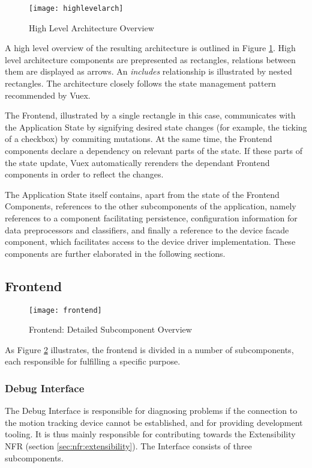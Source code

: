 \begin{figure}[h]
    \centering
    \texttt{[image: highlevelarch]}
    \caption{High Level Architecture Overview}
    \label{fig:high-level-architecture}
\end{figure}
A high level overview of the resulting architecture is outlined in Figure \ref{fig:high-level-architecture}. High level architecture components are prepresented as rectangles, relations between them are displayed as arrows. An \emph{includes} relationship is illustrated by nested rectangles. The architecture closely follows the state management pattern recommended by Vuex. 

The Frontend, illustrated by a single rectangle in this case, communicates with the Application State by signifying desired state changes (for example, the ticking of a checkbox) by commiting mutations. At the same time, the Frontend components declare a dependency on relevant parts of the state. If these parts of the state update, Vuex automatically rerenders the dependant Frontend components in order to reflect the changes.

The Application State itself contains, apart from the state of the Frontend Components, references to the other subcomponents of the application, namely references to a component facilitating persistence, configuration information for data preprocessors and classifiers, and finally a reference to the device facade component, which facilitates access to the device driver implementation. These components are further elaborated in the following sections. 

\subsection{Frontend}
\label{sec:impl:frontend}
\begin{figure}[h]
    \centering
    \texttt{[image: frontend]}
    \caption{Frontend: Detailed Subcomponent Overview}
    \label{fig:frontend-overview}
\end{figure}

As Figure \ref{fig:frontend-overview} illustrates, the frontend is divided in a number of subcomponents, each responsible for fulfilling a specific purpose.

\subsubsection{Debug Interface}
The Debug Interface is responsible for diagnosing problems if the connection to the motion tracking device cannot be established, and for providing development tooling. It is thus mainly responsible for contributing towards the Extensibility \gls{NFR} (section \ref{sec:nfr:extensibility}). The Interface consists of three subcomponents.

